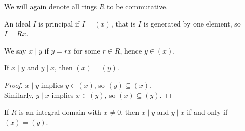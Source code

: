 We will again denote all rings \(R\) to be commutative.
\begin{recall}
	An ideal \(I\) is principal if \(I = \left( x \right) \), that is \(I\) is generated by one element, so \(I = Rx\).
\end{recall}
\begin{notation}
	We say \(x \mid y\) if \(y = rx\) for some \(r \in R\), hence \(y \in \left( x \right) \).
\end{notation}
\begin{proposition}
	If \(x \mid y\) and \(y \mid x\), then \(\left( x \right)  = \left( y \right) \).
\end{proposition}
\begin{proof}
	\(x \mid y\) 	implies \(y \in \left( x \right) \), so \(\left( y \right) \subseteq \left( x \right) \).\\
	Similarly, \(y \mid x\) implies \(x \in \left( y \right) \), so \(\left( x \right) \subseteq \left( y \right) \).
\end{proof}
\begin{proposition}
	If \(R\) is an integral domain with \(x \neq 0\), then \(x \mid y\) and \(y \mid x\) if and only if \(\left( x \right)  = \left( y \right) \).
\end{proposition}
